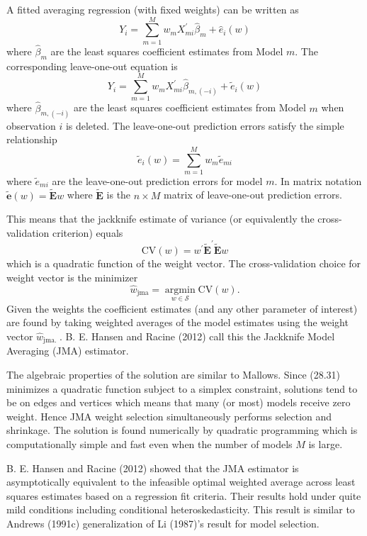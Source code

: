 \documentclass[10pt]{article}
\begin{document}
A fitted averaging regression (with fixed weights) can be written as
$$
Y_{i}=\sum_{m=1}^{M} w_{m} X_{m i}^{\prime} \widehat{\beta}_{m}+\widehat{e}_{i}(w)
$$
where $\widehat{\beta}_{m}$ are the least squares coefficient estimates from Model $m$. The corresponding leave-one-out equation is
$$
Y_{i}=\sum_{m=1}^{M} w_{m} X_{m i}^{\prime} \widehat{\beta}_{m,(-i)}+\widetilde{e}_{i}(w)
$$
where $\widehat{\beta}_{m,(-i)}$ are the least squares coefficient estimates from Model $m$ when observation $i$ is deleted. The leave-one-out prediction errors satisfy the simple relationship
$$
\widetilde{e}_{i}(w)=\sum_{m=1}^{M} w_{m} \widetilde{e}_{m i}
$$
where $\widetilde{e}_{m i}$ are the leave-one-out prediction errors for model $m$. In matrix notation $\widetilde{\boldsymbol{e}}(w)=\widetilde{\boldsymbol{E}} w$ where $\widetilde{\boldsymbol{E}}$ is the $n \times M$ matrix of leave-one-out prediction errors.

This means that the jackknife estimate of variance (or equivalently the cross-validation criterion) equals
$$
\mathrm{CV}(w)=w^{\prime} \widetilde{\boldsymbol{E}}^{\prime} \widetilde{\boldsymbol{E}} w
$$
which is a quadratic function of the weight vector. The cross-validation choice for weight vector is the minimizer
$$
\widehat{w}_{\mathrm{jma}}=\underset{w \in \mathscr{S}}{\operatorname{argmin}} \mathrm{CV}(w) .
$$
Given the weights the coefficient estimates (and any other parameter of interest) are found by taking weighted averages of the model estimates using the weight vector $\widehat{w}_{\text {jma. }}$. B. E. Hansen and Racine (2012) call this the Jackknife Model Averaging (JMA) estimator.

The algebraic properties of the solution are similar to Mallows. Since (28.31) minimizes a quadratic function subject to a simplex constraint, solutions tend to be on edges and vertices which means that many (or most) models receive zero weight. Hence JMA weight selection simultaneously performs selection and shrinkage. The solution is found numerically by quadratic programming which is computationally simple and fast even when the number of models $M$ is large.

B. E. Hansen and Racine (2012) showed that the JMA estimator is asymptotically equivalent to the infeasible optimal weighted average across least squares estimates based on a regression fit criteria. Their results hold under quite mild conditions including conditional heteroskedasticity. This result is similar to Andrews (1991c) generalization of Li (1987)'s result for model selection.
\end{document}
